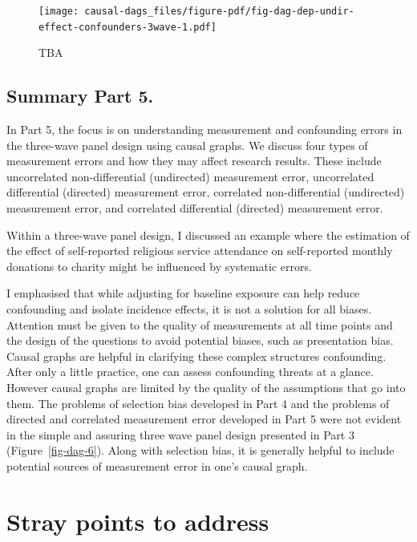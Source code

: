\documentclass[
  singlecolumn]{report}
\begin{document}
\begin{figure}

{\centering \texttt{[image: causal-dags\_files/figure-pdf/fig-dag-dep-undir-effect-confounders-3wave-1.pdf]}

}

\caption{\label{fig-dag-dep-undir-effect-confounders-3wave}TBA}

\end{figure}

\hypertarget{summary-part-5.}{%
\subsection{Summary Part 5.}\label{summary-part-5.}}

In Part 5, the focus is on understanding measurement and confounding
errors in the three-wave panel design using causal graphs. We discuss
four types of measurement errors and how they may affect research
results. These include uncorrelated non-differential (undirected)
measurement error, uncorrelated differential (directed) measurement
error, correlated non-differential (undirected) measurement error, and
correlated differential (directed) measurement error.

Within a three-wave panel design, I discussed an example where the
estimation of the effect of self-reported religious service attendance
on self-reported monthly donations to charity might be influenced by
systematic errors.

I emphasised that while adjusting for baseline exposure can help reduce
confounding and isolate incidence effects, it is not a solution for all
biases. Attention must be given to the quality of measurements at all
time points and the design of the questions to avoid potential biases,
such as presentation bias. Causal graphs are helpful in clarifying these
complex structures confounding. After only a little practice, one can
assess confounding threats at a glance. However causal graphs are
limited by the quality of the assumptions that go into them. The
problems of selection bias developed in Part 4 and the problems of
directed and correlated measurement error developed in Part 5 were not
evident in the simple and assuring three wave panel design presented in
Part 3 (Figure~\ref{fig-dag-6}). Along with selection bias, it is
generally helpful to include potential sources of measurement error in
one's causal graph.

\hypertarget{stray-points-to-address}{%
\section{Stray points to address}\label{stray-points-to-address}}
\end{document}
